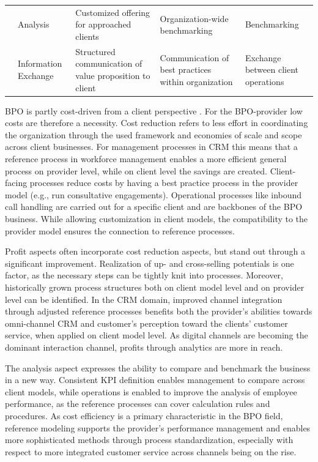 \begin{table}[caption={Benefits of Reference Modelling for BPO-providers in CRM }, label=tab:refmodbpobenefits]
\begin{tabular}{p{1cm} p{2cm} |p{3cm} | p{3cm} | p{3cm} |}
		\multicolumn{1}{|l|}{}                                   & Analysis                            & Customized offering for approached clients              & Organization-wide benchmarking                     & Benchmarking                                                        \\ \cline{2-5} 
		\multicolumn{1}{|l|}{}                                   & Information Exchange                & Structured communication of value proposition to client & Communication of best practices within organization & Exchange between client operations                                  \\ \hline
	\end{tabular}
\end{table}

BPO is partly cost-driven from a client perspective \cite{schewe2007}. For the BPO-provider low costs are therefore a necessity. Cost reduction refers to less effort in coordinating the organization through the used framework and economies of scale and scope across client businesses. For management processes in CRM this means that a reference process in workforce management enables a more efficient general process on provider level, while on client level the savings are created. Client-facing processes reduce costs by having a best practice process in the provider model (e.g., run consultative engagements). Operational processes like inbound call handling are carried out for a specific client and are backbones of the BPO business. While allowing customization in client models, the compatibility to the provider model ensures the connection to reference processes.

Profit aspects often incorporate cost reduction aspects, but stand out through a significant improvement. Realization of up- and cross-selling potentials is one factor, as the necessary steps can be tightly knit into processes. Moreover, historically grown process structures both on client model level and on provider level can be identified. In the CRM domain, improved channel integration through adjusted reference processes benefits both the provider’s abilities towards omni-channel CRM and customer’s perception toward the clients’ customer service, when applied on client model level. As digital channels are becoming the dominant interaction channel, profits through analytics are more in reach.

The analysis aspect expresses the ability to compare and benchmark the business in a new way. Consistent \acrshort{KPI} definition enables management to compare across client models, while operations is enabled to improve the analysis of employee performance, as the reference processes can cover calculation rules and procedures. As cost efficiency is a primary characteristic in the BPO field, reference modeling supports the provider’s performance management and enables more sophisticated methods through process standardization, especially with respect to more integrated customer service across channels being on the rise.

